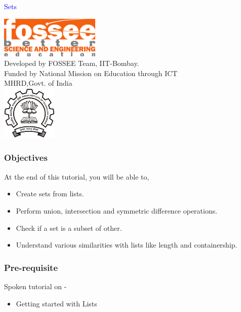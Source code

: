 \documentclass[presentation]{beamer}
\title{}
\author{FOSSEE}
\date{}
\begin{document}
\begin{frame}

\begin{center}
\vspace{12pt}
\textcolor{blue}{\huge Sets}
\end{center}
\vspace{18pt}
\begin{center}
\vspace{10pt}
\includegraphics[scale=0.95]{../images/fossee-logo.png}\\
\vspace{5pt}
\scriptsize Developed by FOSSEE Team, IIT-Bombay. \\ 
\scriptsize Funded by National Mission on Education through ICT\\
\scriptsize  MHRD,Govt. of India\\
\includegraphics[scale=0.30]{../images/iitb-logo.png}\\
\end{center}
\end{frame}
\begin{frame}
\frametitle{Objectives}
\label{sec-2}

  At the end of this tutorial, you will be able to, 


\begin{itemize}
\item Create sets from lists.
\item Perform union, intersection and symmetric difference operations.
\item Check if a set is a subset of other.
\item Understand various similarities with lists like length and containership.
\end{itemize}
\end{frame}
\begin{frame}
\frametitle{Pre-requisite}
\label{sec-3}

Spoken tutorial on -
\begin{itemize}
\item Getting started with Lists
\end{itemize}
\end{frame}
\end{document}
